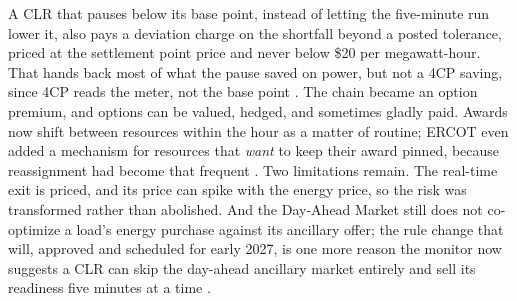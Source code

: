 A CLR that pauses below its base point, instead of letting the five-minute run lower it, also pays a deviation charge on the shortfall beyond a posted tolerance, priced at the settlement point price and never below \$20 per megawatt-hour. That hands back most of what the pause saved on power, but not a 4CP saving, since 4CP reads the meter, not the base point \autocite{ercotnodalrtc2025,ercotclrvars2026}. %
The chain became an option premium, and options can be valued, hedged, and sometimes gladly paid. Awards now shift between resources within the hour as a matter of routine; ERCOT even added a mechanism for resources that \emph{want} to keep their award pinned, because reassignment had become that frequent \autocite{potomac2026somercot,ercotrtcbloadres2025}. %
Two limitations remain. The real-time exit is priced, and its price can spike with the energy price, so the risk was transformed rather than abolished. And the Day-Ahead Market still does not co-optimize a load's energy purchase against its ancillary offer; the rule change that will, approved and scheduled for early 2027, is one more reason the monitor now suggests a CLR can skip the day-ahead ancillary market entirely and sell its readiness five minutes at a time \autocite{potomac2026somercot}. %

